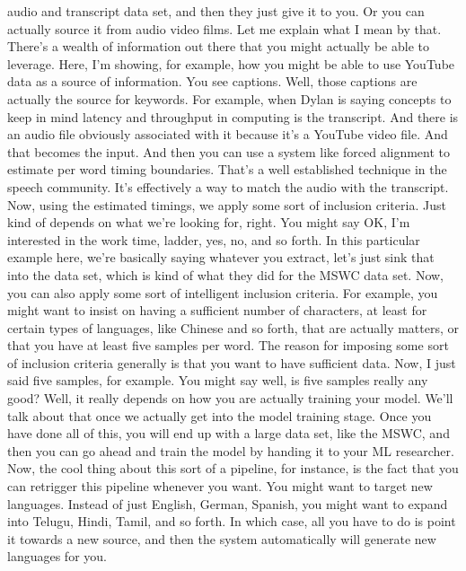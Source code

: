 {{{{    audio and transcript data set, and then they just give it to you.
    Or you can actually source it from audio video films.
    Let me explain what I mean by that.
    There's a wealth of information out there
    that you might actually be able to leverage.
    Here, I'm showing, for example, how you might
    be able to use YouTube data as a source of information.
    You see captions.
    Well, those captions are actually the source for keywords.
    For example, when Dylan is saying concepts to keep in mind
    latency and throughput in computing is the transcript.
    And there is an audio file obviously associated with it
    because it's a YouTube video file.
    And that becomes the input.
    And then you can use a system like forced alignment
    to estimate per word timing boundaries.
    That's a well established technique in the speech community.
    It's effectively a way to match the audio with the transcript.
    Now, using the estimated timings, we apply some sort of inclusion criteria.
    Just kind of depends on what we're looking for, right.
    You might say OK, I'm interested in the work time, ladder, yes, no,
    and so forth.
    In this particular example here, we're basically
    saying whatever you extract, let's just sink
    that into the data set, which is kind of what they did for the MSWC data set.
    Now, you can also apply some sort of intelligent inclusion criteria.
    For example, you might want to insist on having
    a sufficient number of characters, at least for certain types of languages,
    like Chinese and so forth, that are actually matters,
    or that you have at least five samples per word.
    The reason for imposing some sort of inclusion criteria
    generally is that you want to have sufficient data.
    Now, I just said five samples, for example.
    You might say well, is five samples really any good?
    Well, it really depends on how you are actually training your model.
    We'll talk about that once we actually get into the model training stage.
    Once you have done all of this, you will end up
    with a large data set, like the MSWC, and then you
    can go ahead and train the model by handing it to your ML researcher.
    Now, the cool thing about this sort of a pipeline, for instance,
    is the fact that you can retrigger this pipeline whenever you want.
    You might want to target new languages.
    Instead of just English, German, Spanish,
    you might want to expand into Telugu, Hindi, Tamil, and so forth.
    In which case, all you have to do is point it towards a new source,
    and then the system automatically will generate new languages for you.
}}}}
